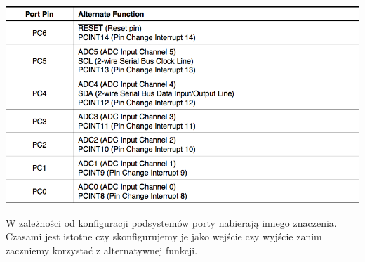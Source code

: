 \documentclass[8pt]{beamer}
\begin{document}
\begin{frame}
\begin{columns}
    \begin{column}[T]{5.5cm}
      \begin{center}
        \includegraphics[scale=0.3333]{images/port-c.png}
      \end{center}

      W zależności od konfiguracji podsystemów porty nabierają innego
      znaczenia. Czasami jest istotne czy skonfigurujemy je jako wejście czy
      wyjście zanim zaczniemy korzystać z alternatywnej funkcji.

    \end{column}
  \end{columns}
\end{frame}
\end{document}
